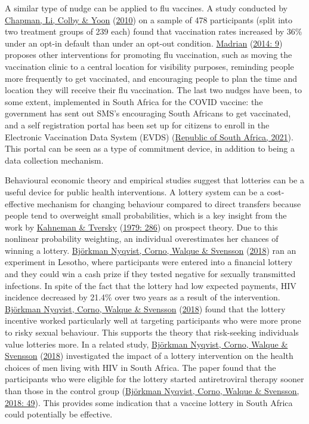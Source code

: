 \documentclass[11pt,preprint, authoryear]{elsarticle}
\numberwithin{equation}{section}
\numberwithin{figure}{section}
\numberwithin{table}{section}
\begin{document}
A similar type of nudge can be applied to flu vaccines. A study
conducted by \protect\hyperlink{ref-opt}{Chapman, Li, Colby \& Yoon}
(\protect\hyperlink{ref-opt}{2010}) on a sample of 478 participants
(split into two treatment groups of 239 each) found that vaccination
rates increased by 36\% under an opt-in default than under an opt-out
condition. \protect\hyperlink{ref-flu}{Madrian}
(\protect\hyperlink{ref-flu}{2014: 9}) proposes other interventions for
promoting flu vaccination, such as moving the vaccination clinic to a
central location for visibility purposes, reminding people more
frequently to get vaccinated, and encouraging people to plan the time
and location they will receive their flu vaccination. The last two
nudges have been, to some extent, implemented in South Africa for the
COVID vaccine: the government has sent out SMS's encouraging South
Africans to get vaccinated, and a self registration portal has been set
up for citizens to enroll in the Electronic Vaccination Data System
(EVDS) (\protect\hyperlink{ref-evds}{Republic of South Africa, 2021}).
This portal can be seen as a type of commitment device, in addition to
being a data collection mechanism.

Behavioural economic theory and empirical studies suggest that lotteries
can be a useful device for public health interventions. A lottery system
can be a cost-effective mechanism for changing behaviour compared to
direct transfers because people tend to overweight small probabilities,
which is a key insight from the work by
\protect\hyperlink{ref-prospect}{Kahneman \& Tversky}
(\protect\hyperlink{ref-prospect}{1979: 286}) on prospect theory. Due to
this nonlinear probability weighting, an individual overestimates her
chances of winning a lottery. \protect\hyperlink{ref-hiv}{Björkman
Nyqvist, Corno, Walque \& Svensson} (\protect\hyperlink{ref-hiv}{2018})
ran an experiment in Lesotho, where participants were entered into a
financial lottery and they could win a cash prize if they tested
negative for sexually transmitted infections. In spite of the fact that
the lottery had low expected payments, HIV incidence decreased by 21.4\%
over two years as a result of the intervention.
\protect\hyperlink{ref-hiv}{Björkman Nyqvist, Corno, Walque \& Svensson}
(\protect\hyperlink{ref-hiv}{2018}) found that the lottery incentive
worked particularly well at targeting participants who were more prone
to risky sexual behaviour. This supports the theory that risk-seeking
individuals value lotteries more. In a related study,
\protect\hyperlink{ref-hiv}{Björkman Nyqvist, Corno, Walque \& Svensson}
(\protect\hyperlink{ref-hiv}{2018}) investigated the impact of a lottery
intervention on the health choices of men living with HIV in South
Africa. The paper found that the participants who were eligible for the
lottery started antiretroviral therapy sooner than those in the control
group (\protect\hyperlink{ref-hiv}{Björkman Nyqvist, Corno, Walque \&
Svensson, 2018: 49}). This provides some indication that a vaccine
lottery in South Africa could potentially be effective.
\end{document}
